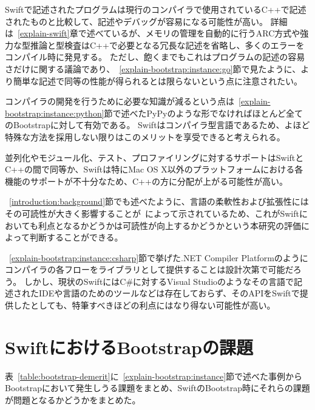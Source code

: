 Swiftで記述されたプログラムは現行のコンパイラで使用されているC++で記述されたものと比較して、記述やデバッグが容易になる可能性が高い。
詳細は~\ref{explain-swift}章で述べているが、メモリの管理を自動的に行うARC方式や強力な型推論と型検査はC++で必要となる冗長な記述を省略し、多くのエラーをコンパイル時に発見する。
ただし、飽くまでもこれはプログラムの記述の容易さだけに関する議論であり、~\ref{explain-bootstrap:instance:go}節で見たように、より簡単な記述で同等の性能が得られるとは限らないという点に注意されたい。

コンパイラの開発を行うために必要な知識が減るという点は~\ref{explain-bootstrap:instance:python}節で述べたPyPyのような形でなければほとんど全てのBootstrapに対して有効である。
Swiftはコンパイラ型言語であるため、よほど特殊な方法を採用しない限りはこのメリットを享受できると考えられる。

並列化やモジュール化、テスト、プロファイリングに対するサポートはSwiftとC++の間で同等か、Swiftは特にMac OS X以外のプラットフォームにおける各機能のサポートが不十分なため、C++の方に分配が上がる可能性が高い。

~\ref{introduction:background}節でも述べたように、言語の柔軟性および拡張性にはその可読性が大きく影響することが~\cite{elshoff}によって示されているため、これがSwiftにおいても利点となるかどうかは可読性が向上するかどうかという本研究の評価によって判断することができる。

~\ref{explain-bootstrap:instance:csharp}節で挙げた.NET Compiler Platformのようにコンパイラの各フローをライブラリとして提供することは設計次第で可能だろう。
しかし、現状のSwiftにはC\#に対するVisual Studioのようなその言語で記述されたIDEや言語のためのツールなどは存在しておらず、そのAPIをSwiftで提供したとしても、特筆すべきほどの利点にはなり得ない可能性が高い。

\section{SwiftにおけるBootstrapの課題}
\label{explain-bootstrap:issue}

表~\ref{table:bootstrap-demerit}に~\ref{explain-bootstrap:instance}節で述べた事例からBootstrapにおいて発生しうる課題をまとめ、SwiftのBootstrap時にそれらの課題が問題となるかどうかをまとめた。

